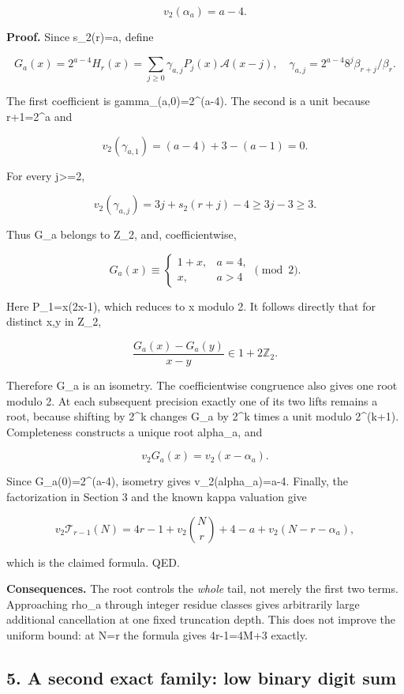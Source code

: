 \documentclass[11pt,letterpaper]{article}
\begin{document}
\[
v_2(\alpha_a)=a-4.
\]

\textbf{Proof.} Since s\_2(r)=a, define

\[
G_a(x)=2^{a-4}H_r(x)
 =\sum_{j\ge0}\gamma_{a,j}P_j(x)\mathscr A(x-j),
\quad
\gamma_{a,j}=2^{a-4}8^j\beta_{r+j}/\beta_r.
\]

The first coefficient is gamma\_(a,0)=2\^{}(a-4). The second is a unit because r+1=2\^{}a and

\[
v_2(\gamma_{a,1})=(a-4)+3-(a-1)=0.
\]

For every j\textgreater=2,

\[
v_2(\gamma_{a,j})=3j+s_2(r+j)-4\ge3j-3\ge3.
\]

Thus G\_a belongs to Z\_2, and, coefficientwise,

\[
G_a(x)\equiv
\begin{cases}1+x,&a=4,\\x,&a>4\end{cases}\pmod2.
\]

Here P\_1=x(2x-1), which reduces to x modulo 2. It follows directly that for distinct x,y in Z\_2,

\[
\frac{G_a(x)-G_a(y)}{x-y}\in1+2\mathbb Z_2.
\]

Therefore G\_a is an isometry. The coefficientwise congruence also gives one root modulo 2. At each subsequent precision exactly one of its two lifts remains a root, because shifting by 2\^{}k changes G\_a by 2\^{}k times a unit modulo 2\^{}(k+1). Completeness constructs a unique root alpha\_a, and

\[
v_2G_a(x)=v_2(x-\alpha_a).
\]

Since G\_a(0)=2\^{}(a-4), isometry gives v\_2(alpha\_a)=a-4. Finally, the factorization in Section 3 and the known kappa valuation give

\[
v_2\mathcal T_{r-1}(N)
=4r-1+v_2\binom Nr+4-a+v_2(N-r-\alpha_a),
\]

which is the claimed formula. QED.

\textbf{Consequences.} The root controls the \emph{whole} tail, not merely the first two terms. Approaching rho\_a through integer residue classes gives arbitrarily large additional cancellation at one fixed truncation depth. This does not improve the uniform bound: at N=r the formula gives 4r-1=4M+3 exactly.

\subsection{5. A second exact family: low binary digit sum}\label{a-second-exact-family-low-binary-digit-sum}
\end{document}
